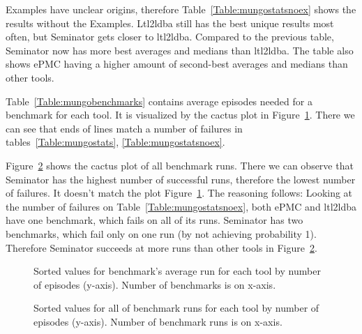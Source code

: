 \documentclass[
	digital,
nolof, nolot
]{fithesis3}
\begin{document}
	Examples have unclear origins, therefore Table~\ref{Table:mungostatsnoex} shows the results without the Examples. Ltl2ldba still has the best unique results most often, but Seminator gets closer to ltl2ldba. Compared to the previous table, Seminator now has more best averages and medians than ltl2ldba. The table also shows ePMC having a higher amount of second-best averages and medians than other tools. 
	
	Table~\ref{Table:mungobenchmarks} contains average episodes needed for a benchmark for each tool. It is visualized by the cactus plot in Figure~\ref{Cactus:mungoaverage}. There we can see that ends of lines match a number of failures in tables~\ref{Table:mungostats}, \ref{Table:mungostatsnoex}.
	
	Figure~\ref{Cactus:mungoruns} shows the cactus plot of all benchmark runs. There we can observe that Seminator has the highest number of successful runs, therefore the lowest number of failures. It doesn't match the plot Figure~\ref{Cactus:mungoaverage}. The reasoning follows: Looking at the number of failures on Table~\ref{Table:mungostatsnoex}, both ePMC and ltl2ldba have one benchmark, which fails on all of its runs. Seminator has two benchmarks, which fail only on one run (by not achieving probability 1). Therefore Seminator succeeds at more runs than other tools in Figure~\ref{Cactus:mungoruns}.
	
	
	
	\begin{table}[ht]
		\centering
		
		\caption{Results with Examples included}
		\label{Table:mungostats}
		
	\end{table}
	
	\begin{table}[ht]
		\centering
		
		\caption{Results with Examples excluded }
		\label{Table:mungostatsnoex}
		
	\end{table}
	
	\begin{table}[ht]
		\centering
		
		\caption{Table of average episodes needed to reach probability 1.}
		\label{Table:mungobenchmarks}
		
	\end{table}
	
	\begin{figure}[ht]
		\centering
		
		\caption{Sorted values for benchmark's average run for each tool by number of episodes (y-axis). Number of benchmarks is on x-axis. }
		\label{Cactus:mungoaverage}
		
	\end{figure}
	\begin{figure}
		\centering
		
		\caption{Sorted values for all of benchmark runs for each tool by number of episodes (y-axis). Number of benchmark runs is on x-axis. }
		\label{Cactus:mungoruns}
	
	\end{figure}
	
\end{document}

